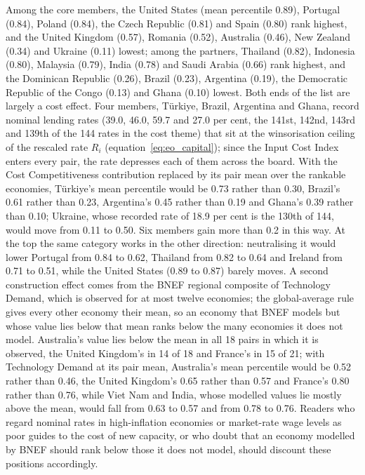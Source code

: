 Among the core members, the United States (mean percentile 0.89), Portugal (0.84), Poland (0.84),
the Czech Republic (0.81) and Spain (0.80) rank highest, and the United Kingdom (0.57), Romania
(0.52), Australia (0.46), New Zealand (0.34) and Ukraine (0.11) lowest; among the partners,
Thailand (0.82), Indonesia (0.80), Malaysia (0.79), India (0.78) and Saudi Arabia (0.66) rank
highest, and the Dominican Republic (0.26), Brazil (0.23), Argentina (0.19), the Democratic
Republic of the Congo (0.13) and Ghana (0.10) lowest. Both ends of the list are largely a cost
effect. Four members, T\"urkiye, Brazil, Argentina and Ghana, record nominal lending rates (39.0,
46.0, 59.7 and 27.0 per cent, the 141st, 142nd, 143rd and 139th of the 144 rates in the cost
theme) that sit at the winsorisation ceiling of the rescaled rate $R_i$
(equation~\eqref{eq:eo_capital}); since the Input Cost Index enters every pair, the rate depresses
each of them across the board. With the Cost Competitiveness contribution replaced by its pair mean
over the rankable economies, T\"urkiye's mean percentile would be 0.73 rather than 0.30, Brazil's
0.61 rather than 0.23, Argentina's 0.45 rather than 0.19 and Ghana's 0.39 rather than 0.10;
Ukraine, whose recorded rate of 18.9 per cent is the 130th of 144, would move from 0.11 to 0.50.
Six members gain more than 0.2 in this way. At the top the same category works in the other
direction: neutralising it would lower Portugal from 0.84 to 0.62, Thailand from 0.82 to 0.64 and
Ireland from 0.71 to 0.51, while the United States (0.89 to 0.87) barely moves. A second
construction effect comes from the BNEF regional composite of Technology Demand, which is observed
for at most twelve economies; the global-average rule gives every other economy their mean, so an
economy that BNEF models but whose value lies below that mean ranks below the many economies it
does not model. Australia's value lies below the mean in all 18 pairs in which it is observed, the
United Kingdom's in 14 of 18 and France's in 15 of 21; with Technology Demand at its pair mean,
Australia's mean percentile would be 0.52 rather than 0.46, the United Kingdom's 0.65 rather than
0.57 and France's 0.80 rather than 0.76, while Viet Nam and India, whose modelled values lie mostly
above the mean, would fall from 0.63 to 0.57 and from 0.78 to 0.76. Readers who regard nominal
rates in high-inflation economies or market-rate wage levels as poor guides to the cost of new
capacity, or who doubt that an economy modelled by BNEF should rank below those it does not model,
should discount these positions accordingly.

